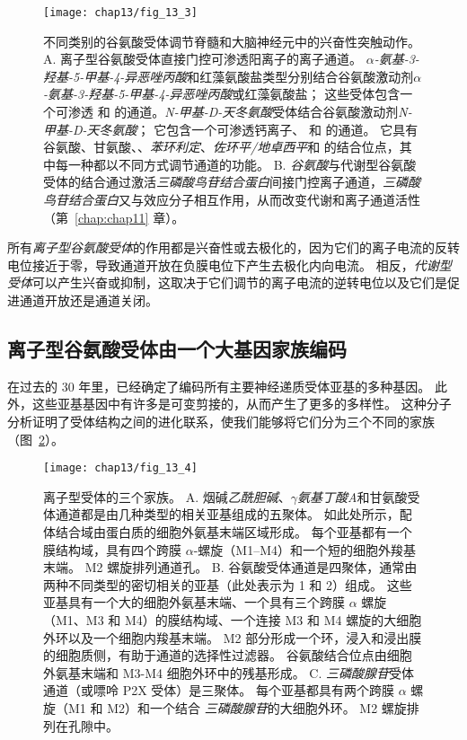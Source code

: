 \begin{figure}[htbp]
	\centering
	\texttt{[image: chap13/fig\_13\_3]}
	\caption{不同类别的谷氨酸受体调节脊髓和大脑神经元中的兴奋性突触动作。
		A. 离子型谷氨酸受体直接门控可渗透阳离子的离子通道。
		\textit{$\alpha$-氨基-3-羟基-5-甲基-4-异恶唑丙酸}和红藻氨酸盐类型分别结合谷氨酸激动剂\textit{$\alpha$-氨基-3-羟基-5-甲基-4-异恶唑丙酸}或红藻氨酸盐；
		这些受体包含一个可渗透  和  的通道。\textit{N-甲基-D-天冬氨酸}受体结合谷氨酸激动剂\textit{N-甲基-D-天冬氨酸}；
		它包含一个可渗透钙离子、 和  的通道。
		它具有谷氨酸、甘氨酸、、\textit{苯环利定}、\textit{佐环平/地卓西平}和  的结合位点，其中每一种都以不同方式调节通道的功能。
		B. \textit{谷氨酸}与代谢型谷氨酸受体的结合通过激活\textit{三磷酸鸟苷结合蛋白}间接门控离子通道，\textit{三磷酸鸟苷结合蛋白}又与效应分子相互作用，从而改变代谢和离子通道活性（第~\ref{chap:chap11} 章）。}
	\label{fig:13_3}
\end{figure}


所有\textit{离子型谷氨酸受体}的作用都是兴奋性或去极化的，因为它们的离子电流的反转电位接近于零，导致通道开放在负膜电位下产生去极化内向电流。
相反，\textit{代谢型受体}可以产生兴奋或抑制，这取决于它们调节的离子电流的逆转电位以及它们是促进通道开放还是通道关闭。



\subsection{离子型谷氨酸受体由一个大基因家族编码}

在过去的 30 年里，已经确定了编码所有主要神经递质受体亚基的多种基因。
此外，这些亚基基因中有许多是可变剪接的，从而产生了更多的多样性。
这种分子分析证明了受体结构之间的进化联系，使我们能够将它们分为三个不同的家族（图~\ref{fig:13_4}）。


\begin{figure}[htbp]
	\centering
	\texttt{[image: chap13/fig\_13\_4]}
	\caption{离子型受体的三个家族。
		A. 烟碱\textit{乙酰胆碱}、\textit{$\gamma$氨基丁酸A}和甘氨酸受体通道都是由几种类型的相关亚基组成的五聚体。
		如此处所示，配体结合域由蛋白质的细胞外氨基末端区域形成。
		每个亚基都有一个膜结构域，具有四个跨膜 $\alpha$-螺旋（M1–M4）和一个短的细胞外羧基末端。
		M2 螺旋排列通道孔。
		B. 谷氨酸受体通道是四聚体，通常由两种不同类型的密切相关的亚基（此处表示为 1 和 2）组成。
		这些亚基具有一个大的细胞外氨基末端、一个具有三个跨膜 $\alpha$ 螺旋（M1、M3 和 M4）的膜结构域、一个连接 M3 和 M4 螺旋的大细胞外环以及一个细胞内羧基末端。
		M2 部分形成一个环，浸入和浸出膜的细胞质侧，有助于通道的选择性过滤器。
		谷氨酸结合位点由细胞外氨基末端和 M3-M4 细胞外环中的残基形成。
		C. \textit{三磷酸腺苷}受体通道（或嘌呤 P2X 受体）是三聚体。
		每个亚基都具有两个跨膜 $\alpha$ 螺旋（M1 和 M2）和一个结合 \textit{三磷酸腺苷}的大细胞外环。
		M2 螺旋排列在孔隙中。}
	\label{fig:13_4}
\end{figure}


